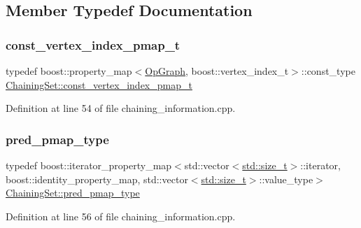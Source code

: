 \subsection{Member Typedef Documentation}
\mbox{\label{structChainingSet_a770d83c8828c7b38df1925810bf31e31}} 
\subsubsection{\texorpdfstring{const\+\_\+vertex\+\_\+index\+\_\+pmap\+\_\+t}{const\_vertex\_index\_pmap\_t}}
{\footnotesize\ttfamily typedef boost\+::property\+\_\+map$<$\hyperlink{structOpGraph}{Op\+Graph}, boost\+::vertex\+\_\+index\+\_\+t$>$\+::const\+\_\+type \hyperlink{structChainingSet_a770d83c8828c7b38df1925810bf31e31}{Chaining\+Set\+::const\+\_\+vertex\+\_\+index\+\_\+pmap\+\_\+t}}



Definition at line 54 of file chaining\+\_\+information.\+cpp.

\mbox{\label{structChainingSet_a0c0db2b75967dbe93b78cd1f4751c780}} 
\subsubsection{\texorpdfstring{pred\+\_\+pmap\+\_\+type}{pred\_pmap\_type}}
{\footnotesize\ttfamily typedef boost\+::iterator\+\_\+property\+\_\+map$<$std\+::vector$<$\hyperlink{tutorial__pact__2019_2Introduction_2sixth_2test_8c_a7c94ea6f8948649f8d181ae55911eeaf}{std\+::size\+\_\+t}$>$\+::iterator, boost\+::identity\+\_\+property\+\_\+map, std\+::vector$<$\hyperlink{tutorial__pact__2019_2Introduction_2sixth_2test_8c_a7c94ea6f8948649f8d181ae55911eeaf}{std\+::size\+\_\+t}$>$\+::value\+\_\+type$>$ \hyperlink{structChainingSet_a0c0db2b75967dbe93b78cd1f4751c780}{Chaining\+Set\+::pred\+\_\+pmap\+\_\+type}}



Definition at line 56 of file chaining\+\_\+information.\+cpp.

